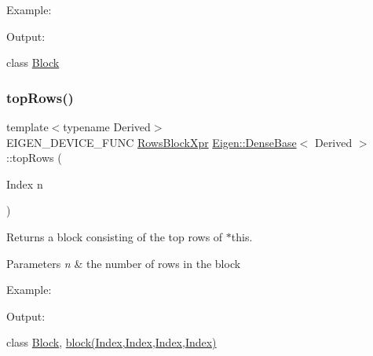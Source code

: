 Example\+: 
\begin{DoxyCodeInclude}{0}
\end{DoxyCodeInclude}
 Output\+: 
\begin{DoxyVerbInclude}
\end{DoxyVerbInclude}
 class \mbox{\hyperlink{class_eigen_1_1_block}{Block}} \mbox{\label{class_eigen_1_1_dense_base_ad3e01f9216955704228eaeac0b442d24}} 
\subsubsection{\texorpdfstring{topRows()}{topRows()}\hspace{0.1cm}{\footnotesize\ttfamily [1/2]}}
{\footnotesize\ttfamily template$<$typename Derived$>$ \\
E\+I\+G\+E\+N\+\_\+\+D\+E\+V\+I\+C\+E\+\_\+\+F\+U\+NC \mbox{\hyperlink{class_eigen_1_1_block}{Rows\+Block\+Xpr}} \mbox{\hyperlink{class_eigen_1_1_dense_base}{Eigen\+::\+Dense\+Base}}$<$ Derived $>$\+::top\+Rows (\begin{DoxyParamCaption}\item[{Index}]{n }\end{DoxyParamCaption})\hspace{0.3cm}{\ttfamily [inline]}}

\begin{DoxyReturn}{Returns}
a block consisting of the top rows of $\ast$this.
\end{DoxyReturn}

\begin{DoxyParams}{Parameters}
{\em n} & the number of rows in the block\\
\hline
\end{DoxyParams}
Example\+: 
\begin{DoxyCodeInclude}{0}
\end{DoxyCodeInclude}
 Output\+: 
\begin{DoxyVerbInclude}
\end{DoxyVerbInclude}
 class \mbox{\hyperlink{class_eigen_1_1_block}{Block}}, \mbox{\hyperlink{class_eigen_1_1_dense_base_ab8e42e67c5cfd5fa13e684642f0f65bf}{block(\+Index,\+Index,\+Index,\+Index)}} \mbox{\label{class_eigen_1_1_dense_base_adfabe2228a3ff52ad88e51675aa31557}} 
